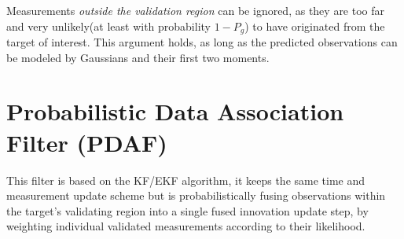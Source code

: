 Measurements \emph{outside the validation region} can be ignored, as they are too far and very unlikely(at least with probability $1-P_g$) to have originated from the target of interest. This argument holds, as long as the predicted observations can be modeled by Gaussians and their first two moments.
\section{Probabilistic Data Association Filter (PDAF)} \label{sec:PDAF}

This filter is based on the KF/EKF algorithm, it keeps the same time and measurement update scheme but is probabilistically fusing
observations within the target's validating region into a single fused innovation update step, by weighting individual validated measurements according to their likelihood.

